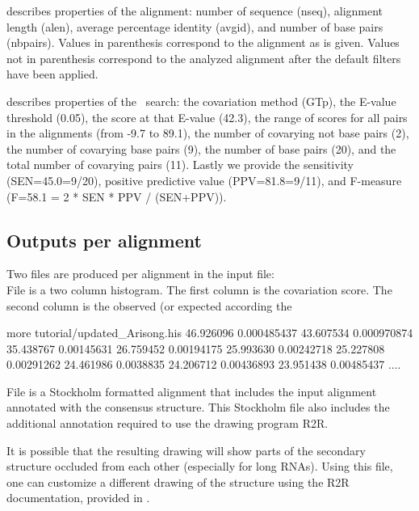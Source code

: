 \begin{sreitems}{}
\item[\emprog{First comment line}]describes properties of the
  alignment: number of sequence (nseq), alignment length (alen),
  average percentage identity (avgid), and number of base pairs
  (nbpairs).  Values in parenthesis correspond to the alignment as is
  given. Values not in parenthesis correspond to the analyzed
  alignment after the default filters have been applied.

\item[\emprog{Second comment line}]describes properties of the
  \rscape\ search: the covariation method (GTp), the E-value threshold
  (0.05), the score at that E-value (42.3), the range of scores for all
  pairs in the alignments (from -9.7 to 89.1), the number of covarying
  not base pairs (2), the number of covarying base pairs (9), the
  number of base pairs (20), and the total number of covarying pairs
  (11). Lastly we provide the sensitivity (SEN=45.0=9/20), positive
  predictive value (PPV=81.8=9/11), and F-measure (F=58.1 = 2 * SEN *
  PPV / (SEN+PPV)).
\end{sreitems}


\subsection{Outputs per alignment}
Two files are produced per alignment in the input file: \\

File  is a two column
histogram. The first column is the covariation score. The second
column is the observed (or expected according the
 
\begin{sreoutput}
more tutorial/updated_Arisong.his
46.926096       0.000485437
43.607534       0.000970874
35.438767       0.00145631
26.759452       0.00194175
25.993630       0.00242718
25.227808       0.00291262
24.461986       0.0038835
24.206712       0.00436893
23.951438       0.00485437
....
\end{sreoutput}


File  is a Stockholm
formatted alignment that includes the input alignment annotated with
the consensus structure. This Stockholm file also includes the
additional annotation required to use the drawing program R2R.

It is possible that the resulting drawing will show parts of the
secondary structure occluded from each other (especially for long
RNAs).  Using this file, one can customize a different drawing of the
structure using the R2R documentation, provided in
.


